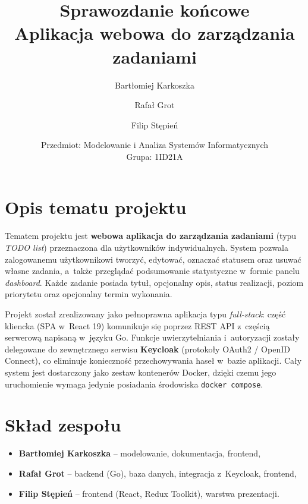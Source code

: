 \documentclass[12pt, a4paper, oneside]{article}
\title{\LARGE\bfseries Sprawozdanie końcowe\\[0.4cm]
  {\Large Aplikacja webowa do zarządzania zadaniami}}
\author{Bartłomiej Karkoszka \and Rafał Grot \and Filip Stępień}
\date{Przedmiot: Modelowanie i Analiza Systemów Informatycznych\\Grupa: 1ID21A}
\begin{document}
\maketitle
\thispagestyle{empty}

\vspace{1.0cm}

\tableofcontents
\newpage

\section{Opis tematu projektu}

Tematem projektu jest \textbf{webowa aplikacja do zarządzania zadaniami}
(typu \emph{TODO list}) przeznaczona dla użytkowników indywidualnych.
System pozwala zalogowanemu użytkownikowi tworzyć, edytować, oznaczać
statusem oraz usuwać własne zadania, a~także przeglądać podsumowanie
statystyczne w~formie panelu \emph{dashboard}. Każde zadanie posiada
tytuł, opcjonalny opis, status realizacji, poziom priorytetu oraz
opcjonalny termin wykonania.

Projekt został zrealizowany jako pełnoprawna aplikacja typu
\emph{full-stack}: część kliencka (SPA w~React 19) komunikuje się
poprzez REST API z~częścią serwerową napisaną w~języku Go. Funkcje
uwierzytelniania i~autoryzacji zostały delegowane do zewnętrznego
serwisu \textbf{Keycloak} (protokoły OAuth2 / OpenID Connect),
co eliminuje konieczność przechowywania haseł w~bazie aplikacji.
Cały system jest dostarczony jako zestaw kontenerów Docker, dzięki
czemu jego uruchomienie wymaga jedynie posiadania środowiska
\texttt{docker compose}.

\section{Skład zespołu}

\begin{itemize}
  \item \textbf{Bartłomiej Karkoszka} -- modelowanie, dokumentacja, frontend,
  \item \textbf{Rafał Grot} -- backend (Go), baza danych, integracja z~Keycloak, frontend,
  \item \textbf{Filip Stępień} -- frontend (React, Redux Toolkit), warstwa prezentacji.
\end{itemize}
\end{document}
